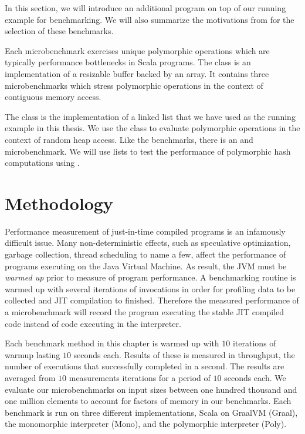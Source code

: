 In this section, we will introduce an additional program on top of our running example for benchmarking.
We will also summarize the motivations from \cite{scala:miniboxing} for the selection of these benchmarks.

Each microbenchmark exercises unique polymorphic operations which are typically performance bottlenecks\cite{scala:collections-optimization}\cite{scala:dacapo} in Scala programs.
The  class is an implementation of a resizable buffer backed by an array.
It contains three microbenchmarks which stress polymorphic operations in the context of contiguous memory access.

The  class is the implementation of a linked list that we have used as the running example in this thesis.
We use the  class to evaluate polymorphic operations in the context of random heap access.
Like the  benchmarks, there is an  and  microbenchmark.
We will use lists to test the performance of polymorphic hash computations using .

\section{Methodology}

Performance measurement of just-in-time compiled programs is an infamously difficult issue\cite{java:performance-analysis}\cite{java:statistically-rigor-performance-analysis}.
Many non-deterministic effects, such as speculative optimization, garbage collection, thread scheduling to name a few, affect the performance of programs executing on the Java Virtual Machine.
As result, the JVM must be \textit{warmed up} prior to measure of program performance.
A benchmarking routine is warmed up with several iterations of invocations in order for profiling data to be collected and JIT compilation to finished.
Therefore the measured performance of a microbenchmark will record the program executing the stable JIT compiled code instead of code executing in the interpreter.

Each benchmark method in this chapter is warmed up with $10$ iterations of warmup lasting $10$ seconds each.
Results of these is measured in throughput, the number of executions that successfully completed in a second.
The results are averaged from $10$ measurements iterations for a period of $10$ seconds each.
We evaluate our microbenchmarks on input sizes between one hundred thousand and one million elements to account for factors of memory in our benchmarks. 
Each benchmark is run on three different implementations, Scala on GraalVM (Graal), the monomorphic interpreter (Mono), and the polymorphic interpreter (Poly).

